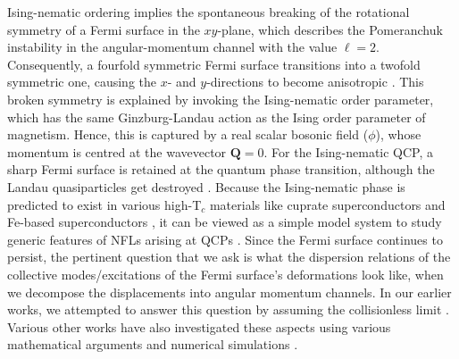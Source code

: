 \documentclass[aps, prb, onecolumn, nofootinbib, citeautoscript, 10pt]{revtex4-2}
\begin{document}
Ising-nematic ordering implies the spontaneous breaking of the rotational symmetry of a Fermi surface in the $xy$-plane, which describes the Pomeranchuk instability in the angular-momentum channel with the value $\ell=2$. Consequently, a fourfold symmetric Fermi surface transitions into a twofold symmetric one, causing the $x$- and $y$-directions to become anisotropic \cite{metlsach1, sachdev_2011}. This broken symmetry is explained by invoking the Ising-nematic order parameter, which has the same Ginzburg-Landau action as the Ising order parameter of magnetism. Hence, this is captured by a real scalar bosonic field ($\phi$), whose momentum is centred at the wavevector $\mathbf{Q} = 0$. For the Ising-nematic QCP, a sharp Fermi surface is retained at the quantum phase transition, although the Landau quasiparticles get destroyed \cite{Lee-Dalid,ips-uv-ir1, ips-uv-ir2, ips-subir}. Because the Ising-nematic phase is predicted to exist in various high-T$_c$ materials like cuprate superconductors \cite{yoichi, hinkov, Kohsaka, Daou} and Fe-based superconductors \cite{hsu2008superconductivity, margadonna2008crystal,mcqueen2009tetragonal}, it can be viewed as a simple model system to study generic features of NFLs arising at QCPs \cite{Lee-Dalid, ips-uv-ir1, ips-fflo, ips-2kf, ips-cavity}. Since the Fermi surface continues to persist, the pertinent question that we ask is what the dispersion relations of the collective modes/excitations of the Fermi surface's deformations look like, when we decompose the displacements into angular momentum channels. In our earlier works, we attempted to answer this question by assuming the collisionless limit \cite{ips-zero-mode, ips-kazi}. Various other works have also investigated these aspects using various mathematical arguments and numerical simulations \cite{debanjan, else, khveshchenko}. 
\end{document}

